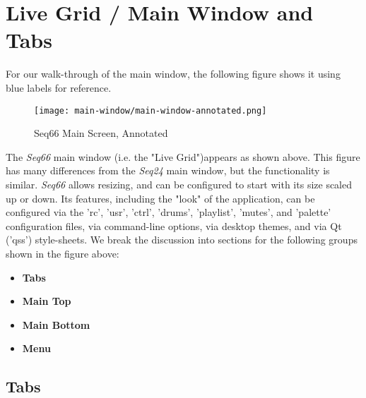 %
%
%

\section{Live Grid / Main Window and Tabs}
\label{sec:live_grid}

   For our walk-through of the main window, the following figure
   shows it using blue labels for reference.

\begin{figure}[H]
   \centering 
   \texttt{[image: main-window/main-window-annotated.png]}
   \caption{Seq66 Main Screen, Annotated}
   \label{fig:main_screen_annotated}
\end{figure}

   The \textsl{Seq66} main window (i.e. the "Live Grid")appears as shown above.
   This figure has many differences from the \textsl{Seq24} main window,
   but the functionality is similar.
   \textsl{Seq66} allows resizing, and can
   be configured to start with its size scaled up or down.
   Its features, including the "look" of the application,
   can be configured via the 'rc', 'usr', 'ctrl', 'drums', 'playlist', 'mutes',
   and 'palette' configuration files, via command-line options, via
   desktop themes, and via Qt ('qss') style-sheets.
   We break the discussion into sections for the following
   groups shown in the figure above:

   \begin{itemize}
      \item \textbf{Tabs}
      \item \textbf{Main Top}
      \item \textbf{Main Bottom}
      \item \textbf{Menu}
   \end{itemize}

\subsection{Tabs}
\label{subsec:introduction_main_tabs}

